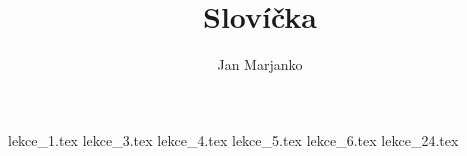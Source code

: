\documentclass[article]{jlreq}
\title{Slovíčka}
\author{Jan Marjanko}
\begin{document}
\maketitle
\tableofcontents
\newpage

{lekce_1.tex}
{lekce_3.tex}
{lekce_4.tex}
{lekce_5.tex}
{lekce_6.tex}
{lekce_24.tex}
\end{document}
